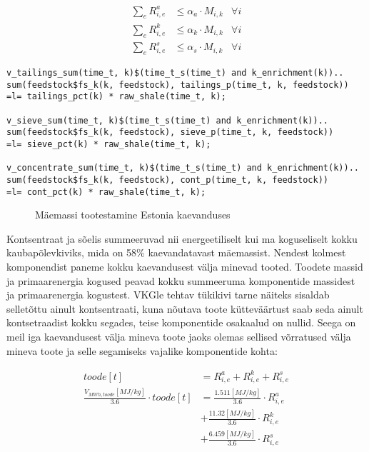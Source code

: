 \documentclass[10pt,a4paper]{article}
\begin{document}
\begin{align}
\sum_e R^a_{i,e} &\le \mathit{\alpha_a} \cdot M_{i,k} & \forall i \\
\sum_e R^k_{i,e} &\le \mathit{\alpha_k} \cdot M_{i,k} & \forall i \\
\sum_e R^s_{i,e} &\le \mathit{\alpha_s}  \cdot M_{i,k} & \forall i  
\end{align}
\begin{verbatim}
v_tailings_sum(time_t, k)$(time_t_s(time_t) and k_enrichment(k))..
sum(feedstock$fs_k(k, feedstock), tailings_p(time_t, k, feedstock))
=l= tailings_pct(k) * raw_shale(time_t, k);

v_sieve_sum(time_t, k)$(time_t_s(time_t) and k_enrichment(k))..
sum(feedstock$fs_k(k, feedstock), sieve_p(time_t, k, feedstock))
=l= sieve_pct(k) * raw_shale(time_t, k);

v_concentrate_sum(time_t, k)$(time_t_s(time_t) and k_enrichment(k))..
sum(feedstock$fs_k(k, feedstock), cont_p(time_t, k, feedstock))
=l= cont_pct(k) * raw_shale(time_t, k);
\end{verbatim}

\begin{figure}

\caption{Mäemassi tootestamine Estonia kaevanduses
\label{joon2}}
\end{figure}


Kontsentraat ja sõelis summeeruvad nii energeetiliselt kui ma koguseliselt kokku kaubapõlevkiviks, mida on 58\% kaevandatavast mäemassist. Nendest kolmest komponendist paneme kokku kaevandusest välja minevad tooted. Toodete massid ja primaarenergia kogused peavad kokku summeeruma komponentide massidest ja primaarenergia kogustest. VKGle tehtav tükikivi tarne näiteks sisaldab selletõttu ainult kontsentraati, kuna nõutava toote kütteväärtust saab seda ainult kontsetraadist kokku segades, teise komponentide osakaalud on nullid. Seega on meil iga kaevandusest välja mineva toote jaoks olemas sellised võrratused välja mineva toote ja selle segamiseks vajalike komponentide kohta:

\begin{align}
toode [t] & = R^a_{i,e} + R^k_{i,e} + R^s_{i,e} \nonumber \\
\frac{\mathit{V}_{MWh, toode} [MJ/kg]}{3.6} \cdot toode [t] & = \frac{1.511 [MJ/kg]}{3.6}\cdot R^a_{i,e}  \nonumber \\
&+ \frac{11.32 [MJ/kg]}{3.6} \cdot R^k_{i,e} \nonumber \\ 
&+ \frac{6.459 [MJ/kg]}{3.6} \cdot R^s_{i,e}
\end{align}
\end{document}
